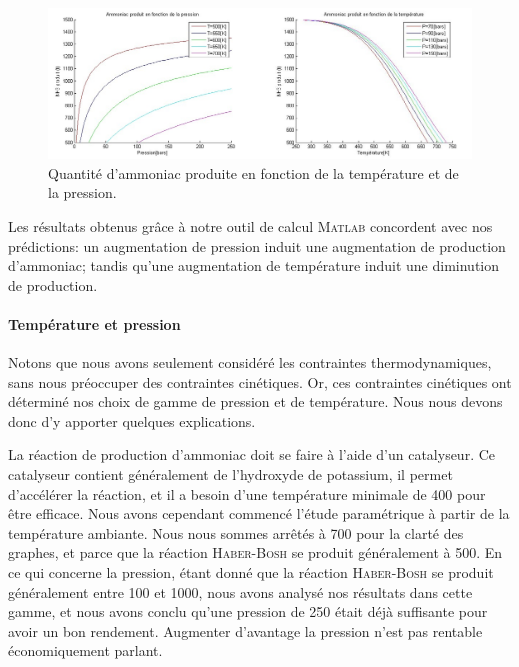 \documentclass[11pt,a4paper]{report}
\begin{document}
\begin{figure}[ht!]
 \centering
 \includegraphics[scale=0.4]{fct_pression.jpg}
 \caption{Quantité d'ammoniac produite en fonction de la température et de la pression.}
 \label{fct_pression}
\end{figure}

Les résultats obtenus grâce à notre outil de calcul \textsc{Matlab} concordent avec nos prédictions: un augmentation
de pression induit une augmentation de production d'ammoniac; tandis qu'une augmentation de température induit une 
diminution de production.

\paragraph{Température et pression}
Notons que nous avons seulement considéré les contraintes thermodynamiques, sans nous préoccuper des contraintes 
cinétiques. Or, ces contraintes cinétiques ont déterminé nos choix de gamme de pression et de température. Nous nous 
devons donc d'y apporter quelques explications.

La réaction de production d'ammoniac doit se faire à l'aide d'un catalyseur. Ce catalyseur contient généralement de 
l'hydroxyde de potassium, il permet d'accélérer la réaction, et il a besoin d'une température minimale de \unit{400}{\celsius} 
pour être efficace. Nous avons cependant commencé l'étude paramétrique à partir de la température ambiante. Nous nous sommes
arrêtés à \unit{700}{\celsius} pour la clarté des graphes, et parce que la réaction \textsc{Haber-Bosh} se produit généralement à \unit{500}{\celsius}. 
En ce qui concerne la pression, étant donné que la réaction \textsc{Haber-Bosh} se produit généralement entre \unit{100}{\bbar} et \unit{1000}{\bbar},
nous avons analysé nos résultats dans cette gamme, et nous avons conclu qu'une pression de \unit{250}{\bbar} était déjà 
suffisante pour avoir un bon rendement. Augmenter d'avantage la pression n'est pas rentable économiquement parlant.
\end{document}
